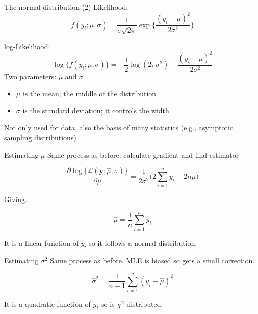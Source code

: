 \documentclass[
  ignorenonframetext,
]{beamer}
\providecommand{\tightlist}{%
  \setlength{\itemsep}{0pt}\setlength{\parskip}{0pt}}
\begin{document}
\begin{frame}{The normal distribution (2)}
\label{the-normal-distribution-2}
Likelihood: \begin{equation}
f(y_i;\mu, \sigma) = \frac{1}{\sigma\sqrt{2\pi}}\exp\biggl\{\frac{(y_i-\mu)^2}{2\sigma^2}\biggr\}
\end{equation}

log-Likelihood: \begin{equation}
\log\{f(y_i;\mu, \sigma)\} = -\frac{1}{2}\log(2\pi\sigma^2) -\frac{(y_i-\mu)^2}{2\sigma^2}
\end{equation} Two parameters: \(\mu\) and \(\sigma\)

\begin{itemize}
\tightlist
\item
  \(\mu\) is the mean; the middle of the distribution
\item
  \(\sigma\) is the standard deviation; it controls the width
\end{itemize}

Not only used for data, also the basis of many statistics (e.g.,
asymptotic sampling distributions)
\end{frame}

\begin{frame}{Estimating \(\mu\)}
\label{estimating-mu}
Same process as before: calculate gradient and find estimator

\begin{equation}
\frac{\partial\log\{\mathcal{L}(\textbf{y};\hat{\mu},\sigma)\}}{\partial\mu} = \frac{1}{2\sigma^2}\biggl(2\sum \limits^n_{i=1}y_i-2n\mu\biggl)
\end{equation}

Giving..

\begin{equation}
\hat{\mu} = \frac{1}{n}\sum \limits^n_{i=1}y_i
\end{equation}

It is a linear function of \(y_i\) so it follows a normal distribution.
\end{frame}

\begin{frame}{Estimating \(\sigma^2\)}
\label{estimating-sigma2}
Same process as before. MLE is biased so gets a small correction.

\begin{equation}
\hat{\sigma}^2 = \frac{1}{n-1}\sum \limits^n_{i=1}(y_i-\hat{\mu})^2
\end{equation}

It is a quadratic function of \(y_i\) so is \(\chi^2\)-distributed.
\end{frame}
\end{document}
